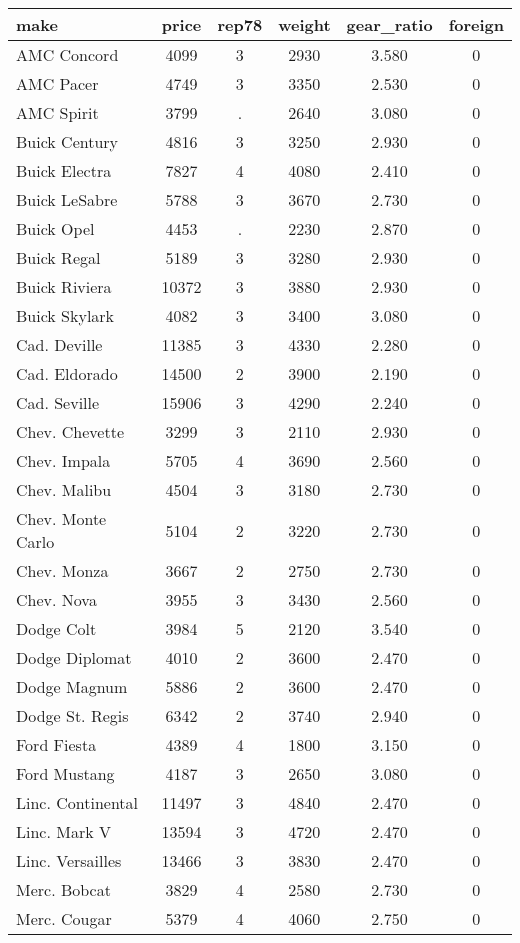 \documentclass[]{article}
\begin{document}
\begin{center}
\begin{tabular}{lccccc} \hline
make & price & rep78 & weight & gear\_ratio & foreign \\ \hline
AMC Concord & 4099 & 3 & 2930 & 3.580 & 0 \\
AMC Pacer & 4749 & 3 & 3350 & 2.530 & 0 \\
AMC Spirit & 3799 & . & 2640 & 3.080 & 0 \\
Buick Century & 4816 & 3 & 3250 & 2.930 & 0 \\
Buick Electra & 7827 & 4 & 4080 & 2.410 & 0 \\
Buick LeSabre & 5788 & 3 & 3670 & 2.730 & 0 \\
Buick Opel & 4453 & . & 2230 & 2.870 & 0 \\
Buick Regal & 5189 & 3 & 3280 & 2.930 & 0 \\
Buick Riviera & 10372 & 3 & 3880 & 2.930 & 0 \\
Buick Skylark & 4082 & 3 & 3400 & 3.080 & 0 \\
Cad. Deville & 11385 & 3 & 4330 & 2.280 & 0 \\
Cad. Eldorado & 14500 & 2 & 3900 & 2.190 & 0 \\
Cad. Seville & 15906 & 3 & 4290 & 2.240 & 0 \\
Chev. Chevette & 3299 & 3 & 2110 & 2.930 & 0 \\
Chev. Impala & 5705 & 4 & 3690 & 2.560 & 0 \\
Chev. Malibu & 4504 & 3 & 3180 & 2.730 & 0 \\
Chev. Monte Carlo & 5104 & 2 & 3220 & 2.730 & 0 \\
Chev. Monza & 3667 & 2 & 2750 & 2.730 & 0 \\
Chev. Nova & 3955 & 3 & 3430 & 2.560 & 0 \\
Dodge Colt & 3984 & 5 & 2120 & 3.540 & 0 \\
Dodge Diplomat & 4010 & 2 & 3600 & 2.470 & 0 \\
Dodge Magnum & 5886 & 2 & 3600 & 2.470 & 0 \\
Dodge St. Regis & 6342 & 2 & 3740 & 2.940 & 0 \\
Ford Fiesta & 4389 & 4 & 1800 & 3.150 & 0 \\
Ford Mustang & 4187 & 3 & 2650 & 3.080 & 0 \\
Linc. Continental & 11497 & 3 & 4840 & 2.470 & 0 \\
Linc. Mark V & 13594 & 3 & 4720 & 2.470 & 0 \\
Linc. Versailles & 13466 & 3 & 3830 & 2.470 & 0 \\
Merc. Bobcat & 3829 & 4 & 2580 & 2.730 & 0 \\
 Merc. Cougar & 5379 & 4 & 4060 & 2.750 & 0 \\ \hline
\end{tabular}
\end{center}
\end{document}
